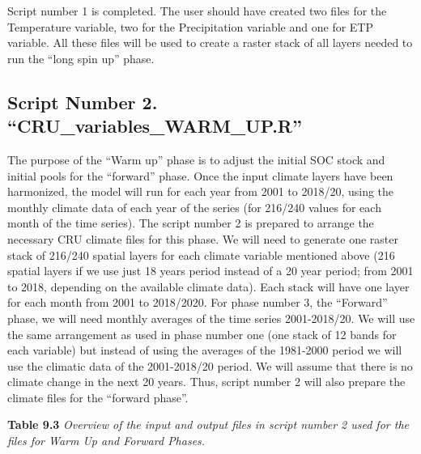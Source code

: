\documentclass[
  10pt,
  b5paper,
]{book}
\begin{document}
Script number 1 is completed. The user should have created two files for the Temperature variable, two for the Precipitation variable and one for ETP variable. All these files will be used to create a raster stack of all layers needed to run the ``long spin up'' phase.

\hypertarget{script-number-2.-cru_variables_warm_up.r}{%
\subsection{Script Number 2. ``CRU\_variables\_WARM\_UP.R''}\label{script-number-2.-cru_variables_warm_up.r}}

The purpose of the ``Warm up'' phase is to adjust the initial SOC stock and initial pools for the ``forward'' phase. Once the input climate layers have been harmonized, the model will run for each year from 2001 to 2018/20, using the monthly climate data of each year of the series (for 216/240 values for each month of the time series). The script number 2 is prepared to arrange the necessary CRU climate files for this phase. We will need to generate one raster stack of 216/240 spatial layers for each climate variable mentioned above (216 spatial layers if we use just 18 years period instead of a 20 year period; from 2001 to 2018, depending on the available climate data). Each stack will have one layer for each month from 2001 to 2018/2020.
For phase number 3, the ``Forward'' phase, we will need monthly averages of the time series 2001-2018/20. We will use the same arrangement as used in phase number one (one stack of 12 bands for each variable) but instead of using the averages of the 1981-2000 period we will use the climatic data of the 2001-2018/20 period. We will assume that there is no climate change in the next 20 years. Thus, script number 2 will also prepare the climate files for the ``forward phase''.

\textbf{Table 9.3} \emph{Overview of the input and output files in script number 2 used for the files for Warm Up and Forward Phases.}
\end{document}
